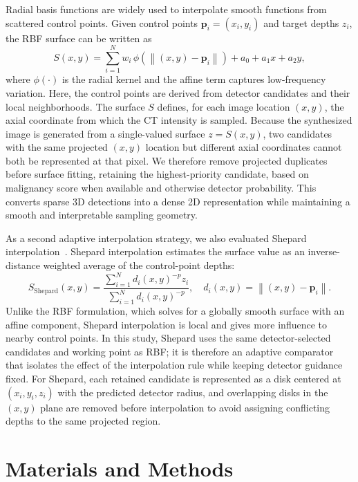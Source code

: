 \documentclass[preprint,12pt]{elsarticle}
\begin{document}
Radial basis functions are widely used to interpolate smooth functions from scattered control points. Given control points $\mathbf{p}_i=(x_i,y_i)$ and target depths $z_i$, the RBF surface can be written as
\begin{equation}
    S(x,y) = \sum_{i=1}^{N} w_i \, \phi\left(\left\|(x,y)-\mathbf{p}_i\right\|\right) + a_0 + a_1 x + a_2 y,
\end{equation}
where $\phi(\cdot)$ is the radial kernel and the affine term captures low-frequency variation. Here, the control points are derived from detector candidates and their local neighborhoods. The surface $S$ defines, for each image location $(x,y)$, the axial coordinate from which the CT intensity is sampled. Because the synthesized image is generated from a single-valued surface $z=S(x,y)$, two candidates with the same projected $(x,y)$ location but different axial coordinates cannot both be represented at that pixel. We therefore remove projected duplicates before surface fitting, retaining the highest-priority candidate, based on malignancy score when available and otherwise detector probability. This converts sparse 3D detections into a dense 2D representation while maintaining a smooth and interpretable sampling geometry.

As a second adaptive interpolation strategy, we also evaluated Shepard interpolation~\cite{shepard1968}. Shepard interpolation estimates the surface value as an inverse-distance weighted average of the control-point depths:
\begin{equation}
    S_{\mathrm{Shepard}}(x,y) =
    \frac{\sum_{i=1}^{N} d_i(x,y)^{-p} z_i}
         {\sum_{i=1}^{N} d_i(x,y)^{-p}},
    \quad
    d_i(x,y)=\left\|(x,y)-\mathbf{p}_i\right\|.
\end{equation}
Unlike the RBF formulation, which solves for a globally smooth surface with an affine component, Shepard interpolation is local and gives more influence to nearby control points. In this study, Shepard uses the same detector-selected candidates and working point as RBF; it is therefore an adaptive comparator that isolates the effect of the interpolation rule while keeping detector guidance fixed. For Shepard, each retained candidate is represented as a disk centered at $(x_i,y_i,z_i)$ with the predicted detector radius, and overlapping disks in the $(x,y)$ plane are removed before interpolation to avoid assigning conflicting depths to the same projected region.

\section{Materials and Methods}
\end{document}
